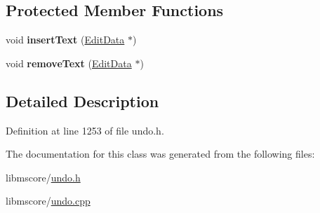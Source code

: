 \subsection*{Protected Member Functions}
\begin{DoxyCompactItemize}
\item 
\mbox{\label{class_ms_1_1_change_text_ad10bf33fd65c11b6c6ae477070cad74f}} 
void {\bfseries insert\+Text} (\hyperlink{class_ms_1_1_edit_data}{Edit\+Data} $\ast$)
\item 
\mbox{\label{class_ms_1_1_change_text_ad84e989ad131a4e377b75a908c2f6e30}} 
void {\bfseries remove\+Text} (\hyperlink{class_ms_1_1_edit_data}{Edit\+Data} $\ast$)
\end{DoxyCompactItemize}


\subsection{Detailed Description}


Definition at line 1253 of file undo.\+h.



The documentation for this class was generated from the following files\+:\begin{DoxyCompactItemize}
\item 
libmscore/\hyperlink{undo_8h}{undo.\+h}\item 
libmscore/\hyperlink{undo_8cpp}{undo.\+cpp}\end{DoxyCompactItemize}

